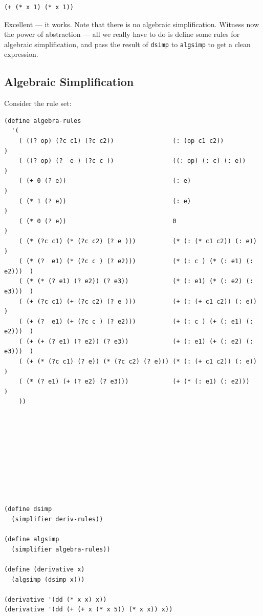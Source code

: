 \documentclass[9pt]{report}
\begin{document}
\begin{verbatim}
(+ (* x 1) (* x 1))
\end{verbatim}


Excellent --- it works. Note that there is no algebraic
simplification. Witness now the power of abstraction --- all we
really have to do is define some rules for algebraic
simplification, and pass the result of \texttt{dsimp} to \texttt{algsimp} to get
a clean expression.

\subsection{Algebraic Simplification}
\label{sec:orge2d654e}
Consider the rule set:

\begin{verbatim}
(define algebra-rules
  '(
    ( ((? op) (?c c1) (?c c2))                (: (op c1 c2))                )
    ( ((? op) (?  e ) (?c c ))                ((: op) (: c) (: e))          )
    ( (+ 0 (? e))                             (: e)                         )
    ( (* 1 (? e))                             (: e)                         )
    ( (* 0 (? e))                             0                             )
    ( (* (?c c1) (* (?c c2) (? e )))          (* (: (* c1 c2)) (: e))       )
    ( (* (?  e1) (* (?c c ) (? e2)))          (* (: c ) (* (: e1) (: e2)))  )
    ( (* (* (? e1) (? e2)) (? e3))            (* (: e1) (* (: e2) (: e3)))  )
    ( (+ (?c c1) (+ (?c c2) (? e )))          (+ (: (+ c1 c2)) (: e))       )
    ( (+ (?  e1) (+ (?c c ) (? e2)))          (+ (: c ) (+ (: e1) (: e2)))  )
    ( (+ (+ (? e1) (? e2)) (? e3))            (+ (: e1) (+ (: e2) (: e3)))  )
    ( (+ (* (?c c1) (? e)) (* (?c c2) (? e))) (* (: (+ c1 c2)) (: e))       )
    ( (* (? e1) (+ (? e2) (? e3)))            (+ (* (: e1) (: e2)))         )
    ))
\end{verbatim}

\begin{verbatim}









(define dsimp
  (simplifier deriv-rules))

(define algsimp
  (simplifier algebra-rules))

(define (derivative x)
  (algsimp (dsimp x)))

(derivative '(dd (* x x) x))
(derivative '(dd (+ (+ x (* x 5)) (* x x)) x))
\end{verbatim}
\end{document}
